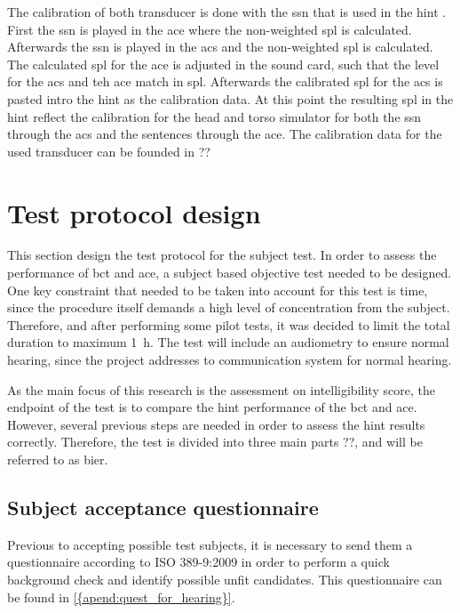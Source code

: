 The calibration of both transducer is done with the \gls{ssn} that is used in the \gls{hint} \citep{nilsson_95}. First the \gls{ssn} is played in the \gls{ace} where the non-weighted \gls{spl} is calculated. Afterwards the \gls{ssn} is played in the \gls{acs} and the non-weighted \gls{spl} is calculated. The calculated \gls{spl} for the \gls{ace} is adjusted in the sound card, such that the level for the \gls{acs} and teh \gls{ace} match in \gls{spl}. Afterwards the calibrated \gls{spl} for the \gls{acs} is pasted intro the \gls{hint} as the calibration data. At this point the resulting \gls{spl}  in the \gls{hint} reflect the calibration for the head and torso simulator for both the \gls{ssn} through the \gls{acs} and the sentences through the \gls{ace}. The calibration data for the used transducer can be founded in ?? %
   
   
   
\section{Test protocol design}
\label{sec:test_protocol_design}   
This section design the test protocol for the subject test. In order to assess the performance of \gls{bct} and \gls{ace}, a subject based objective test needed to be designed. One key constraint that needed to be taken into account for this test is time, since the procedure itself demands a high level of concentration from the subject. Therefore, and after performing some pilot tests, it was decided to limit the total duration to maximum \SI{1}{\hour}. The test will include an audiometry to ensure normal hearing, since the project addresses to communication system for normal hearing.
 
As the main focus of this research is the assessment on intelligibility score, the endpoint of the test is to compare the \gls{hint} performance of the \gls{bct} and \gls{ace}. However, several previous steps are needed in order to assess the \gls{hint} results correctly. Therefore, the test is divided into three main parts ??, and will be referred to as \gls{bier}. 
 
 
 
 \subsection{Subject acceptance questionnaire}
Previous to accepting possible test subjects, it is necessary to send them a questionnaire according to ISO 389-9:2009 \citep{iso_389-9} in order to perform a quick background check and identify possible unfit candidates. This questionnaire can be found in \autoref{{apend:quest_for_hearing}}.
  
